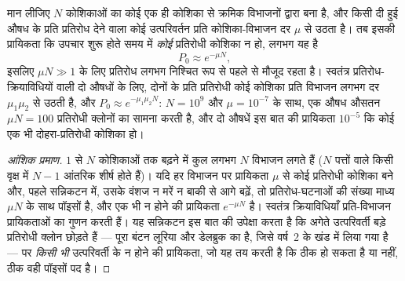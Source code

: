 \begin{theorem}[एक औषध क्यों विफल होती है और दो शायद नहीं]\label{thm:b3:cancer-biology:goldie-coldman}
मान लीजिए $N$ कोशिकाओं का कोई  एक ही कोशिका से क्रमिक विभाजनों
द्वारा बना है, और किसी दी हुई औषध के प्रति प्रतिरोध देने वाला कोई
उत्परिवर्तन प्रति कोशिका-विभाजन दर $\mu$ से उठता है। तब इसकी प्रायिकता
कि उपचार शुरू होते समय  में \emph{कोई} प्रतिरोधी कोशिका न हो,
लगभग यह है
\[
P_{0} \approx e^{-\mu N},
\]
इसलिए $\mu N \gg 1$ के लिए प्रतिरोध लगभग निश्चित रूप से पहले से मौजूद
रहता है। स्वतंत्र प्रतिरोध-क्रियाविधियों वाली दो औषधों के लिए, दोनों के
प्रति प्रतिरोधी कोई कोशिका प्रति विभाजन लगभग दर $\mu_{1}\mu_{2}$ से
उठती है, और $P_{0}
\approx e^{-\mu_{1}\mu_{2}N}$: $N = 10^{9}$ और $\mu = 10^{-7}$ के साथ,
एक औषध औसतन $\mu N = 100$ प्रतिरोधी क्लोनों का सामना करती है, और दो
औषधें इस बात की प्रायिकता $10^{-5}$ कि कोई एक भी दोहरा-प्रतिरोधी कोशिका
हो।
\end{theorem}
\begin{proof}[आंशिक प्रमाण]
$1$ से $N$ कोशिकाओं तक बढ़ने में कुल लगभग $N$ विभाजन लगते हैं ($N$
पत्तों वाले किसी वृक्ष में $N - 1$ आंतरिक शीर्ष होते हैं)। यदि हर विभाजन
पर प्रायिकता $\mu$ से कोई प्रतिरोधी कोशिका बने और, पहले सन्निकटन में,
उसके वंशज न मरें न बाकी से आगे बढ़ें, तो प्रतिरोध-घटनाओं की संख्या माध्य
$\mu N$ के साथ पॉइसों है, और एक भी न होने की प्रायिकता $e^{-\mu N}$ है।
स्वतंत्र क्रियाविधियाँ प्रति-विभाजन प्रायिकताओं का गुणन करती हैं।
यह सन्निकटन इस बात की उपेक्षा करता है कि अगेते उत्परिवर्ती बड़े
प्रतिरोधी क्लोन छोड़ते हैं --- पूरा बंटन लूरिया और डेलब्रुक का है,
जिसे वर्ष~2 के खंड में लिया गया है --- पर \emph{किसी भी} उत्परिवर्ती के
न होने की प्रायिकता, जो यह तय करती है कि  ठीक हो सकता है या नहीं,
ठीक वही पॉइसों पद है।
\end{proof}

